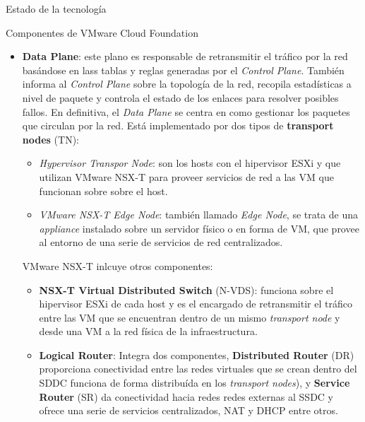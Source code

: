 \begin{section}{Estado de la tecnología}
\begin{subsection}{Componentes de VMware Cloud Foundation \cite{componentesCloudFound}}
\begin{itemize}
\begin{itemize}
        \item \textbf{Data Plane}: este plano es responsable de retransmitir el tráfico por la red basándose en lass tablas  y reglas generadas por el \textit{Control Plane}. También informa al \textit{Control Plane} sobre la topología de la red, recopila estadísticas a nivel de paquete y controla el estado de los enlaces para resolver posibles fallos. En definitiva, el \textit{Data Plane} se centra en como gestionar los paquetes que circulan por la red. Está implementado por dos tipos de \textbf{transport nodes} (TN):
        \begin{itemize}
            \item \textit{Hypervisor Transpor Node}: son los hosts con el hipervisor ESXi y que utilizan VMware NSX-T para proveer servicios de red a las VM que funcionan sobre sobre el host.
            \item \textit{VMware NSX-T Edge Node}: también llamado \textit{Edge Node}, se trata de una \textit{appliance} instalado sobre un servidor físico o en forma de VM, que provee al entorno de una serie de servicios de red centralizados.
        \end{itemize}
VMware NSX-T inlcuye otros componentes:
    \begin{itemize}
        \item \textbf{NSX-T Virtual Distributed Switch} (N-VDS): funciona sobre el hipervisor ESXi de cada host y es el encargado de retransmitir el tráfico entre las VM que se encuentran dentro de un mismo \textit{transport node} y desde una VM a la red física de la infraestructura.
        \item \textbf{Logical Router}: Integra dos componentes, \textbf{Distributed Router} (DR) proporciona conectividad entre las redes virtuales que se crean dentro del SDDC funciona de forma distribuída en los \textit{transport nodes}), y \textbf{Service Router} (SR) da conectividad hacia redes redes externas al SSDC y ofrece una serie de servicios centralizados, NAT y DHCP entre otros.

\end{itemize}
\end{itemize}
\end{itemize}
\end{subsection}
\end{section}
